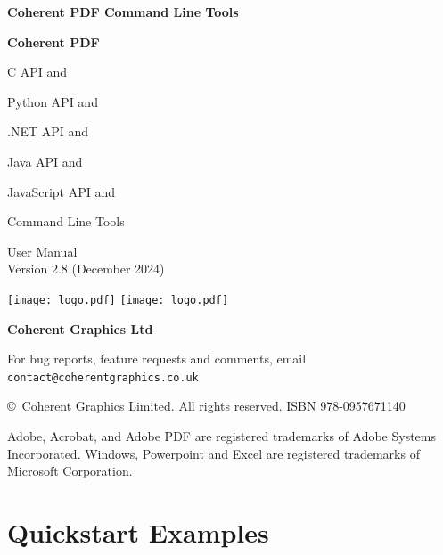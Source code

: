 \documentclass{book}
\newcommand{\smallgap}{\bigskip}
\begin{document}
\frontmatter
\pagestyle{empty}

\begin{flushright}



\ifdefined\HCode
{\sffamily \bfseries \Huge Coherent PDF Command Line Tools}
\else
{\sffamily \bfseries \Huge Coherent PDF

\vspace{2mm}
\begin{cpdflib}
C API and 
\end{cpdflib}
\begin{pycpdflib}
Python API and
\end{pycpdflib}
\begin{dotnetcpdflib}
.NET API and
\end{dotnetcpdflib}
\begin{jcpdflib}
Java API and
\end{jcpdflib}
\begin{jscpdflib}
JavaScript API and
\end{jscpdflib}
Command Line Tools}
\fi

\vspace{12mm}

{\Huge User Manual}\\
Version 2.8 (December 2024)

\vspace{25mm}

\vfill
\ifdefined\HCode
  \texttt{[image: logo.pdf]}
\else
  \texttt{[image: logo.pdf]}
\fi

\vspace{2mm}
{\sffamily \bfseries \LARGE Coherent Graphics Ltd}

\end{flushright}

\clearpage

\pagestyle{empty}
\noindent For bug reports, feature requests and comments, email\\ \texttt{contact@coherentgraphics.co.uk}

\vspace*{\fill}
\noindent\copyright\ Coherent Graphics Limited. All rights reserved. ISBN 978-0957671140

\smallgap 
\noindent Adobe, Acrobat, and Adobe PDF are
registered trademarks of Adobe Systems Incorporated. Windows, Powerpoint and
Excel are registered trademarks of Microsoft Corporation.

\cleardoublepage

\pagestyle{plain}
\chapter*{Quickstart Examples}
\end{document}
